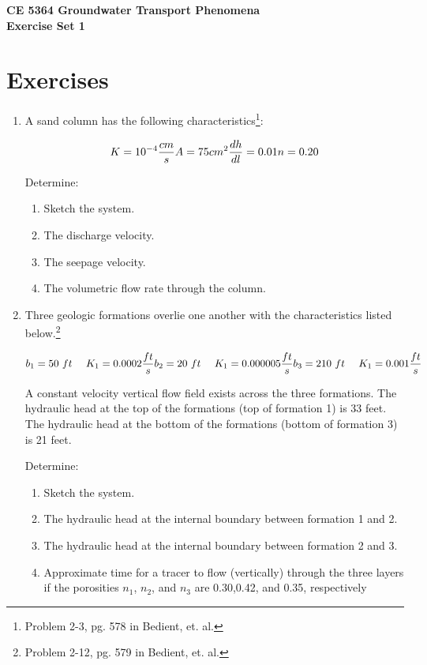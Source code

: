 \documentclass[12pt]{article}
\begin{document}
\begin{center}
{\textbf{{ CE 5364 Groundwater Transport Phenomena } \\ {Exercise Set 1}}}
\end{center}

\section*{\small{Exercises}}
\begin{enumerate}
\item 

A sand column has the following characteristics\footnote{Problem 2-3, pg. 578 in Bedient, et. al.}:

$$ K = 10^{-4} \frac{cm}{s} \\ A = 75 cm^{2} \\ \frac{dh}{dl} = 0.01 \\ n = 0.20$$

Determine:
\begin{enumerate}
\item Sketch the system.
\item The discharge velocity.
\item The seepage velocity.
\item The volumetric flow rate through the column.
\end{enumerate}

\item Three geologic formations overlie one another with the characteristics listed below.\footnote{Problem 2-12, pg. 579 in Bedient, et. al.}

$$ b_1 = 50~ft ~~~~ K_1 = 0.0002 \frac{ft}{s}\\ b_2 = 20~ft ~~~~ K_1 = 0.000005 \frac{ft}{s}\\ b_3 = 210~ft ~~~~ K_1 = 0.001 \frac{ft}{s}$$

A constant velocity vertical flow field exists across the three formations.
The hydraulic head at the top of the formations (top of formation 1) is 33 feet.  The hydraulic head at the bottom of the formations (bottom of formation 3) is 21 feet.

Determine:
\begin{enumerate}
\item Sketch the system.
\item The hydraulic head at the internal boundary between formation 1 and 2.
\item The hydraulic head at the internal boundary between formation 2 and 3.
\item Approximate time for a tracer to flow (vertically) through the three layers if the porosities $n_1$, $n_2$, and $n_3$ are 0.30,0.42, and 0.35, respectively
\end{enumerate}


\end{enumerate}
\end{document}
